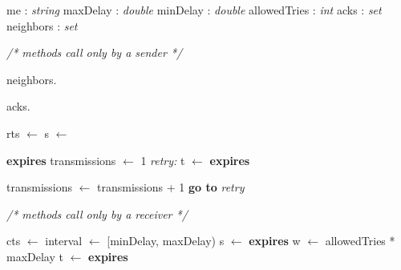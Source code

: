 \begin{algorithm}[t]
	\begin{algorithmic}[1]

		\BeginVariables
			\State me : \emph{string} 
			\State maxDelay : \emph{double}
			\State minDelay : \emph{double}
			\State allowedTries : \emph{int} 
			\State acks : \emph{set}
			\State neighbors : \emph{set}			
		\EndVariables

		\State \emph{/* methods call only by a sender */}
		
			\State neighbors.
		\EndFunction
		
			\State acks.
		\EndFunction

			\State rts $\gets$ 
			\State {}
			\State s $\gets$ 

			\BeginWhenS \textbf{expires}
					\Return {}
				\EndIf
				\State transmissions $\gets$ 1
				\State \emph{retry:} 
				\State t $\gets$ 
				\BeginWhenT \textbf{expires}
						\Return
					\EndIf
					
					\State transmissions $\gets$ transmissions + 1
						\State \textbf{go to} \emph{retry}
					\EndIf
				
				\EndWhenT
			\EndWhenS
		\EndFunction
		
		\State \emph{/* methods call only by a receiver */}
		
				\State cts $\gets$ 
				\State interval $\gets$ [minDelay, maxDelay)
				\State s $\gets$ 
				\BeginWhenS \textbf{expires}
					\State {}
					\State w $\gets$ allowedTries * maxDelay
					\State t $\gets$ 
					\BeginWhenT \textbf{expires}
						\State {}
					\EndWhenT
				\EndWhenS
			\EndIf
		\EndFunction
		
	\end{algorithmic}	
\caption{Procedures of MAC protocol}\label{algorithm:mac:sender}
\end{algorithm}
